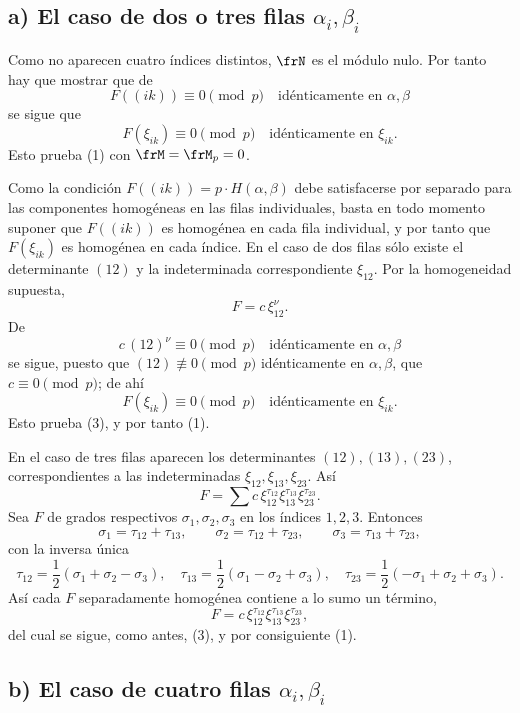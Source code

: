 \documentclass[11pt]{article}
\begin{document}
\subsection*{a) El caso de dos o tres filas \(\alpha_i,\beta_i\)}

Como no aparecen cuatro índices distintos, \(\frN\) es el módulo nulo. Por tanto hay que mostrar que de
\begin{equation}
        F((ik))\equiv0\pmod p\quad \text{idénticamente en \(\alpha,\beta\)}
\end{equation}
se sigue que
\[
        F(\xi_{ik})\equiv0\pmod p\quad \text{idénticamente en \(\xi_{ik}\)}.
\]
Esto prueba (1) con \(\frM=\frM_p=0\).

Como la condición \(F((ik))=p\cdot H(\alpha,\beta)\) debe satisfacerse por separado para las componentes homogéneas en las filas individuales, basta en todo momento suponer que \(F((ik))\) es homogénea en cada fila individual, y por tanto que \(F(\xi_{ik})\) es homogénea en cada índice. En el caso de dos filas sólo existe el determinante \((12)\) y la indeterminada correspondiente \(\xi_{12}\). Por la homogeneidad supuesta,
\[
        F=c\,\xi_{12}^\nu.
\]
De
\[
        c\,(12)^\nu\equiv0\pmod p\quad \text{idénticamente en \(\alpha,\beta\)}
\]
se sigue, puesto que \((12)\not\equiv0\pmod p\) idénticamente en \(\alpha,\beta\), que \(c\equiv0\pmod p\); de ahí
\[
        F(\xi_{ik})\equiv0\pmod p\quad \text{idénticamente en \(\xi_{ik}\)}.
\]
Esto prueba (3), y por tanto (1).

En el caso de tres filas aparecen los determinantes \((12),(13),(23)\), correspondientes a las indeterminadas \(\xi_{12},\xi_{13},\xi_{23}\). Así
\[
        F=\sum c\,\xi_{12}^{\tau_{12}}\xi_{13}^{\tau_{13}}\xi_{23}^{\tau_{23}}.
\]
Sea \(F\) de grados respectivos \(\sigma_1,\sigma_2,\sigma_3\) en los índices \(1,2,3\). Entonces
\[
        \sigma_1=\tau_{12}+\tau_{13},\qquad
        \sigma_2=\tau_{12}+\tau_{23},\qquad
        \sigma_3=\tau_{13}+\tau_{23},
\]
con la inversa única
\[
        \tau_{12}=\frac12(\sigma_1+\sigma_2-\sigma_3),\quad
        \tau_{13}=\frac12(\sigma_1-\sigma_2+\sigma_3),\quad
        \tau_{23}=\frac12(-\sigma_1+\sigma_2+\sigma_3).
\]
Así cada \(F\) separadamente homogénea contiene a lo sumo un término,
\[
        F=c\,\xi_{12}^{\tau_{12}}\xi_{13}^{\tau_{13}}\xi_{23}^{\tau_{23}},
\]
del cual se sigue, como antes, (3), y por consiguiente (1).

\subsection*{b) El caso de cuatro filas \(\alpha_i,\beta_i\)}
\end{document}

